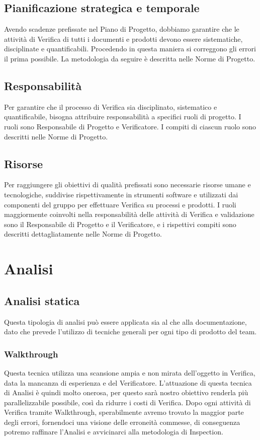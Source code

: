 \subsection{Pianificazione strategica e temporale} %
\label{2.6}
Avendo scadenze prefissate nel Piano di Progetto, dobbiamo garantire che le attività di Verifica di tutti i documenti e prodotti devono essere sistematiche, disciplinate e quantificabili. Procedendo in questa maniera si correggono gli errori il prima possibile.
La metodologia da seguire è descritta nelle Norme di Progetto.

\subsection{Responsabilità} %
\label{2.7}
Per garantire che il processo di Verifica sia disciplinato, sistematico e quantificabile, bisogna attribuire responsabilità a specifici ruoli di progetto. I ruoli sono Responsabile di Progetto e Verificatore. I compiti di ciascun ruolo sono descritti nelle Norme di Progetto.

\subsection{Risorse} %
\label{2.8}
Per raggiungere gli obiettivi di qualità prefissati sono necessarie risorse umane e tecnologiche, suddivise rispettivamente in strumenti software e  utilizzati dai componenti del gruppo per effettuare Verifica su processi e prodotti. I ruoli maggiormente coinvolti nella responsabilità delle attività di Verifica e validazione sono il Responsabile di Progetto e il Verificatore, e i rispettivi compiti sono descritti dettagliatamente nelle Norme di Progetto.

\newpage
\section{Analisi} %
\label{3.0}

\subsection{Analisi statica}
\label{3.1}
Questa tipologia di analisi può essere applicata sia al  che alla documentazione, dato che prevede l'utilizzo di tecniche generali per ogni tipo di prodotto del team.

\subsubsection{Walkthrough}
\label{3.1.1}
Questa tecnica utilizza una scansione ampia e non mirata dell'oggetto in Verifica, data la mancanza di esperienza e  del Verificatore.
L'attuazione di questa tecnica di Analisi è quindi molto onerosa, per questo sarà nostro obiettivo renderla più parallelizzabile possibile, così da ridurre i costi di Verifica.
Dopo ogni attività di Verifica tramite Walkthrough, sperabilmente avremo trovato la maggior parte degli errori, fornendoci una visione delle erroneità commesse, di conseguenza potremo raffinare l'Analisi e avvicinarci alla metodologia di Inspection.

